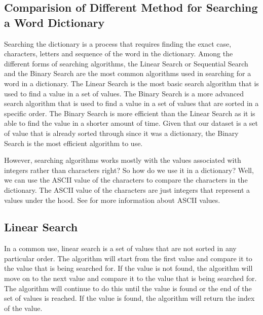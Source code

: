 \documentclass[12pt]{article}
\begin{document}
    \subsection*{Comparision of Different Method for Searching a Word Dictionary}
    \par Searching the dictionary is a process that requires finding the exact case, characters, letters and sequence of the word in the dictionary. Among the different forms of searching algorithms, the Linear Search or Sequential Search and the Binary Search are the most common algorithms used in searching for a word in a dictionary. The Linear Search is the most basic search algorithm that is used to find a value in a set of values. The Binary Search is a more advanced search algorithm that is used to find a value in a set of values that are sorted in a specific order. The Binary Search is more efficient than the Linear Search as it is able to find the value in a shorter amount of time.\cite*{sorting_algorithm_comparison} Given that our dataset is a set of value that is already sorted through since it was a dictionary, the Binary Search is the most efficient algorithm to use. 
    
    \par However, searching algorithms works mostly with the values associated with integers rather than characters right? So how do we use it in a dictionary? Well, we can use the ASCII value of the characters to compare the characters in the dictionary. The ASCII value of the characters are just integers that represent a values under the hood. See \cite*{ascii_reference} for more information about ASCII values.
    \subsection*{Linear Search}
    \par In a common use, linear search is a set of values that are not sorted in any particular order. The algorithm will start from the first value and compare it to the value that is being searched for. If the value is not found, the algorithm will move on to the next value and compare it to the value that is being searched for. The algorithm will continue to do this until the value is found or the end of the set of values is reached. If the value is found, the algorithm will return the index of the value.\cite*{linear_search}
\end{document}
